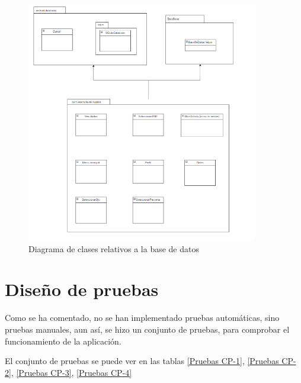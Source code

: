             \begin{figure}[!ht]
                 \centering
                 \includegraphics[width=0.9\textwidth]{img/Diagrama de clases 2.png}
                  \caption{Diagrama de clases relativos a la base de datos}
                 \label{fig:diagramaClases2}
        \end{figure}

\section{Diseño de pruebas}

Como se ha comentado, no se han implementado pruebas automáticas, sino pruebas manuales, aun así, se hizo un conjunto de pruebas, para comprobar el funcionamiento de la aplicación.

El conjunto de pruebas se puede ver en las tablas \ref{Pruebas CP-1}, \ref{Pruebas CP-2}, \ref{Pruebas CP-3}, \ref{Pruebas CP-4}


